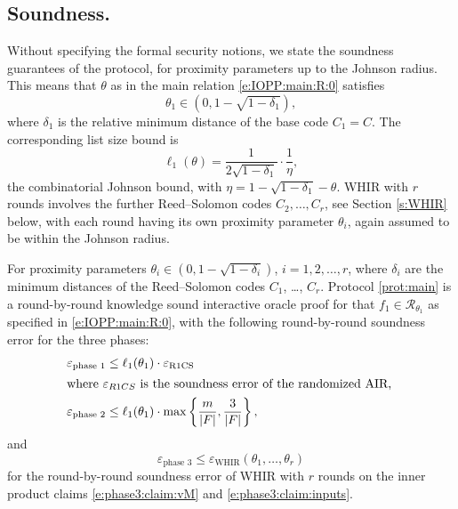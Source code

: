 \subsection{Soundness.}
\label{s:IOPP:soundness:discussion}

Without specifying the formal security notions, we state the soundness guarantees of the protocol, for proximity parameters up to the Johnson radius.
This means that $\theta$ as in the main relation \eqref{e:IOPP:main:R:0} satisfies
\[
\theta_1 \in \left(0, 1 -\sqrt{1 - \delta_1}\right),
\]
where $\delta_1$ is the relative minimum distance of the base code $C_1 = C$. 
The corresponding list size bound is
\[
\ell_1(\theta) =  \frac{1}{2 \sqrt{1-\delta_1}} \cdot \frac{1}{\eta},
\]
the combinatorial Johnson bound, with  $\eta =1 - \sqrt{1 - \delta_1} - \theta$.
WHIR with $r$ rounds involves the further Reed--Solomon codes $C_2,\ldots, C_r$, see Section \ref{s:WHIR} below, with each round having its own proximity parameter $\theta_i$, again assumed to be within the Johnson radius. 

\begin{thm}
\label{thm:main:soundness:informal}
For proximity parameters $\theta_i\in \left(0, 1 - \sqrt{1-\delta_i} \right)$, $i=1,2,\ldots, r$, where $\delta_i$ are the minimum distances of the Reed--Solomon codes $C_1$, \ldots, $C_r$.
Protocol \ref{prot:main} is a round-by-round knowledge sound interactive oracle proof for that $f_1\in \mathcal R_{\theta_1}$ as specified in \eqref{e:IOPP:main:R:0}, with the following round-by-round soundness error for the three phases:
\begin{align}
\label{e:phase1:soundness:error}
\varepsilon_\text{phase 1} 
&\leq 
    \ell_1(\theta_1) \cdot \varepsilon_\text{R1CS} 
\\\intertext{%
where $\varepsilon_{R1CS}$ is the soundness error of the randomized AIR, 
}\label{e:phase2:soundness:error}
\varepsilon_\text{phase 2}  
&\leq \ell_1(\theta_1) \cdot \max\left\{\frac{m}{|F|}, \frac{3}{|F|}\right\},
\end{align}
and 
\begin{equation}
\varepsilon_\text{phase 3} \leq 
\varepsilon_\text{WHIR}(\theta_1,\ldots, \theta_r)
\end{equation}
for the round-by-round soundness error of WHIR with $r$ rounds on the inner product claims \eqref{e:phase3:claim:vM} and \eqref{e:phase3:claim:inputs}.
\end{thm}



